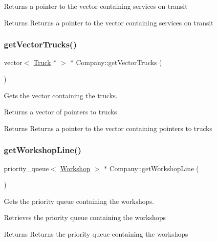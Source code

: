 Returns a pointer to the vector containing services on transit

\begin{DoxyReturn}{Returns}
Returns a pointer to the vector containing services on transit 
\end{DoxyReturn}
\mbox{\label{class_company_a78feb735977ce59f253a30082dbf24b6}} 
\subsubsection{\texorpdfstring{get\+Vector\+Trucks()}{getVectorTrucks()}}
{\footnotesize\ttfamily vector$<$ \hyperlink{class_truck}{Truck} $\ast$ $>$ $\ast$ Company\+::get\+Vector\+Trucks (\begin{DoxyParamCaption}{ }\end{DoxyParamCaption})}



Gets the vector containing the trucks. 

Returns a vector of pointers to trucks

\begin{DoxyReturn}{Returns}
Returns a pointer to the vector containing pointers to trucks 
\end{DoxyReturn}
\mbox{\label{class_company_a339f3025b003f464ffd058d5dbdf43e2}} 
\subsubsection{\texorpdfstring{get\+Workshop\+Line()}{getWorkshopLine()}}
{\footnotesize\ttfamily priority\+\_\+queue$<$ \hyperlink{class_workshop}{Workshop} $>$ $\ast$ Company\+::get\+Workshop\+Line (\begin{DoxyParamCaption}{ }\end{DoxyParamCaption})}



Gets the priority queue containing the workshops. 

Retrieves the priority queue containing the workshops

\begin{DoxyReturn}{Returns}
Returns the priority queue containing the workshops 
\end{DoxyReturn}
\mbox{\label{class_company_a1e471fb69b7924e03cfdc01c3692f26c}} 
